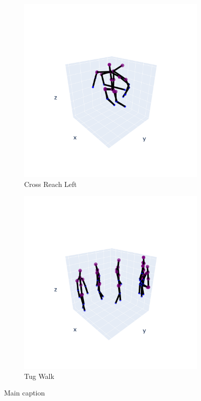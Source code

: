 \begin{figure}[h]
            \begin{subfigure}{.5\textwidth}
                \centering
                \includegraphics[width=.9\linewidth]{../src/resources/mov-plots/mov-2.png}
                \caption{Cross Reach Left}
                \label{fig:mov-2}
            \end{subfigure}
            \begin{subfigure}{.5\textwidth}
                \centering
                \includegraphics[width=.9\linewidth]{../src/resources/mov-plots/mov-9.png}
                \caption{Tug Walk}
                \label{fig:mov-9}
            \end{subfigure}
            
            \caption{Main caption}
            \label{fig:movements_visualization}
        \end{figure}

